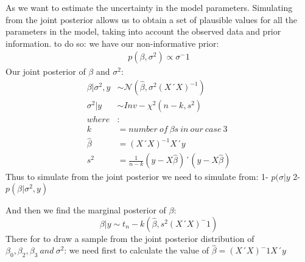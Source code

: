 \documentclass[
]{article}
\newenvironment{Shaded}{\begin{snugshade}}{\end{snugshade}}
\newcommand{\DecValTok}[1]{\textcolor[rgb]{0.00,0.00,0.81}{#1}}
\newcommand{\FunctionTok}[1]{\textcolor[rgb]{0.00,0.00,0.00}{#1}}
\newcommand{\NormalTok}[1]{#1}
\newcommand{\OtherTok}[1]{\textcolor[rgb]{0.56,0.35,0.01}{#1}}
\newcommand{\SpecialCharTok}[1]{\textcolor[rgb]{0.00,0.00,0.00}{#1}}
\begin{document}
As we want to estimate the uncertainty in the model parameters.
Simulating from the joint posterior allows us to obtain a set of
plausible values for all the parameters in the model, taking into
account the observed data and prior information. to do so: we have our
non-informative prior: \[
\begin{aligned}
p(\beta,\sigma^2) \propto \sigma^-1
\end{aligned}
\] Our joint posterior of \(\beta\) and \(\sigma^2\): \[
\begin{aligned}
\beta|\sigma^2,y &\sim \mathcal{N}(\hat\beta,\sigma^2(X´X)^{-1})\\
\sigma^2|y &\sim Inv-\mathcal{\chi^2}(n-k,s^2)\\
where&:\\
k&=number\ of \ \beta s\ in \ our \ case \ 3\\
\hat\beta&= (X´X)^{-1} X´y\\
s^2&= \frac{1}{n-k}(y-X\hat\beta)´(y-X\hat\beta)
\end{aligned}
\] Thus to simulate from the joint posterior we need to simulate from:
1- \(p(\sigma|y\) 2- \(p(\beta|\sigma^2,y)\)

And then we find the marginal posterior of \(\beta\):
\[\beta|y\sim t_n-k(\hat\beta,s^2(X´X)^-1)\] There for to draw a sample
from the joint posterior distribution of
\(\beta_0,\beta_2,\beta_3\ and \ \sigma^2\): we need first to calculate
the value of \(\hat\beta= (X´X)^-1X´y\)

\begin{Shaded}
\end{Shaded}
\end{document}
